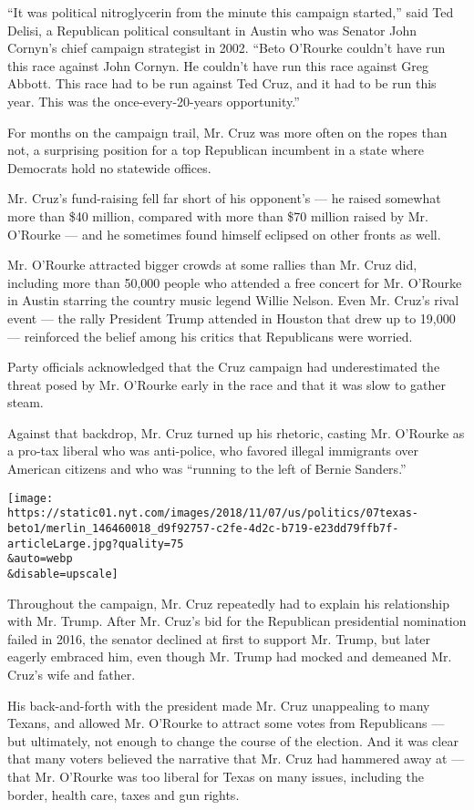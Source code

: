 ``It was political nitroglycerin from the minute this campaign
started,'' said Ted Delisi, a Republican political consultant in Austin
who was Senator John Cornyn's chief campaign strategist in 2002. ``Beto
O'Rourke couldn't have run this race against John Cornyn. He couldn't
have run this race against Greg Abbott. This race had to be run against
Ted Cruz, and it had to be run this year. This was the
once-every-20-years opportunity.''

For months on the campaign trail, Mr. Cruz was more often on the ropes
than not, a surprising position for a top Republican incumbent in a
state where Democrats hold no statewide offices.

Mr. Cruz's fund-raising fell far short of his opponent's --- he raised
somewhat more than \$40 million, compared with more than \$70 million
raised by Mr. O'Rourke --- and he sometimes found himself eclipsed on
other fronts as well.

Mr. O'Rourke attracted bigger crowds at some rallies than Mr. Cruz did,
including more than 50,000 people who attended a free concert for Mr.
O'Rourke in Austin starring the country music legend Willie Nelson. Even
Mr. Cruz's rival event --- the rally President Trump attended in Houston
that drew up to 19,000 --- reinforced the belief among his critics that
Republicans were worried.

Party officials acknowledged that the Cruz campaign had underestimated
the threat posed by Mr. O'Rourke early in the race and that it was slow
to gather steam.

Against that backdrop, Mr. Cruz turned up his rhetoric, casting Mr.
O'Rourke as a pro-tax liberal who was anti-police, who favored illegal
immigrants over American citizens and who was ``running to the left of
Bernie Sanders.''

\texttt{[image: https://static01.nyt.com/images/2018/11/07/us/politics/07texas-beto1/merlin\_146460018\_d9f92757-c2fe-4d2c-b719-e23dd79ffb7f-articleLarge.jpg?quality=75\\\&auto=webp\\\&disable=upscale]}

Throughout the campaign, Mr. Cruz repeatedly had to explain his
relationship with Mr. Trump. After Mr. Cruz's bid for the Republican
presidential nomination failed in 2016, the senator declined at first to
support Mr. Trump, but later eagerly embraced him, even though Mr. Trump
had mocked and demeaned Mr. Cruz's wife and father.

His back-and-forth with the president made Mr. Cruz unappealing to many
Texans, and allowed Mr. O'Rourke to attract some votes from Republicans
--- but ultimately, not enough to change the course of the election. And
it was clear that many voters believed the narrative that Mr. Cruz had
hammered away at --- that Mr. O'Rourke was too liberal for Texas on many
issues, including the border, health care, taxes and gun rights.

